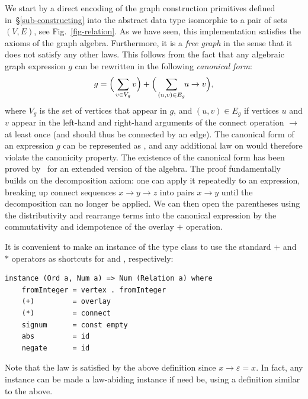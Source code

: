We start by a direct encoding of the graph construction primitives defined
in~\S\ref{sub-constructing} into the abstract data type  isomorphic
to a pair of sets $(V,E)$, see Fig.~\ref{fig-relation}. As we have seen,
this implementation satisfies the axioms of the graph algebra. Furthermore, it
is a \emph{free graph} in the sense that it does not satisfy any other laws.
This follows from the fact that any algebraic graph expression $g$ can be
rewritten in the following \emph{canonical form}:
\[
g = \Big(\sum_{v\in V_g} v\Big) + \Big(\sum_{(u,v)\in E_g} \hspace{-1mm} u \rightarrow v\Big),
\]
\vspace{-1mm}
\noindent
where $V_g$ is the set of vertices that appear in $g$, and $(u,v)\in E_g$ if
vertices $u$ and $v$ appear in the left-hand and right-hand arguments of
the connect operation $\rightarrow$ at least once (and should thus be connected
by an edge). The canonical form of an
expression $g$ can be represented as , and any additional
law on  would therefore violate the canonicity property.
The existence of the canonical form has been proved by~\citet{2014_algebra_mokhov}
for an extended version of the algebra. The proof fundamentally builds on the
decomposition axiom: one can apply it repeatedly to an expression, breaking up
connect sequences $x\rightarrow y\rightarrow z$ into pairs $x \rightarrow y$
until the decomposition can no longer be applied. We can then open the parentheses
using the distributivity and rearrange terms into the canonical expression
by the commutativity and idempotence of the overlay $+$ operation.

It is convenient to make  an instance of the  type class
to use the standard $+$ and $*$ operators as shortcuts for  and
, respectively:

\begin{verbatim}
instance (Ord a, Num a) => Num (Relation a) where
    fromInteger = vertex . fromInteger
    (+)         = overlay
    (*)         = connect
    signum      = const empty
    abs         = id
    negate      = id
\end{verbatim}

\noindent
Note that the  law  is satisfied by the above
definition since $x \rightarrow \varepsilon = x$. In fact, any  instance
can be made a law-abiding  instance if need be, using a definition similar to the above.

